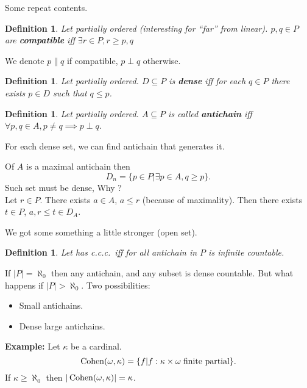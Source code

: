 \documentclass[11pt,pdftex,twoside,a4paper]{article}
\newcommand{\B}[1]{\textbf{#1}}
\newcommand{\Cohen}{\mathop{\rm Cohen}\nolimits}
\newcommand{\ccc}{c.c.c.}
\newtheorem{ldef}[thm]{Definition}
\begin{document}

Some repeat contents.

\begin{ldef}
Let  partially ordered
{\small (interesting for ``far'' from linear)}.
\(p,q\in P\) are \B{compatible}
iff \(\exists r\in P, r\geq p,q\)
\end{ldef}
We denote \(p\| q\) if compatible, \(p\perp q\) otherwise.

\begin{ldef}
Let  partially ordered.
\(D\subseteq P\) is \B{dense} iff for each \(q\in P\) there exists \(p\in D\)
such that \(q\leq p\).
\end{ldef}

\begin{ldef}
Let  partially ordered.
\(A\subseteq P\) is called \B{antichain} iff
\hbox{\(\forall p,q\in A, p\neq q \implies p\perp q\)}.
\end{ldef}

For each dense set, we can find antichain that generates it.

Of $A$ is a maximal antichain then
\begin{equation*}
D_n = \{ p\in P | \exists p \in A, q \geq p\}.
\end{equation*}
Such set must be dense, Why ?\\
Let \(r\in P\). There exists \(a\in A\), \(a \leq r\) (because of maximality).
Then there exists \(t\in P\), \(a,r\leq t \in D_A\).

We got some something a little stronger (open set).

\begin{ldef}
Let  has \ccc\ iff for all antichain in $P$ 
is infinite countable.
\end{ldef}

If \(|P|=\aleph_0\) then any antichain, and any subset is dense countable.
But what happens if \(|P| > \aleph_0\). Two possibilities:
\begin{itemize}
\item Small antichains.
\item Dense large antichains.
\end{itemize}

\B{Example:} Let \(\kappa\) %
be a cardinal.
\begin{equation*}
\Cohen(\omega,\kappa) 
  = \{f | f: \kappa \times \omega \; \textnormal{finite partial}\}.
\end{equation*}
If \(\kappa \geq \aleph_0\) then \(|\Cohen(\omega,\kappa)| = \kappa\).
\end{document}
